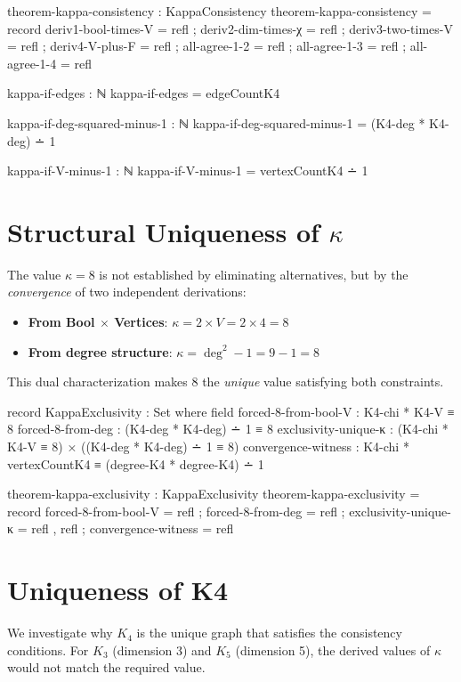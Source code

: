 \documentclass[11pt,a4paper]{book}
\begin{document}
\begin{code}
theorem-kappa-consistency : KappaConsistency
theorem-kappa-consistency = record
  { deriv1-bool-times-V  = refl
  ; deriv2-dim-times-χ   = refl
  ; deriv3-two-times-V   = refl
  ; deriv4-V-plus-F      = refl
  ; all-agree-1-2        = refl
  ; all-agree-1-3        = refl
  ; all-agree-1-4        = refl
  }

kappa-if-edges : ℕ
kappa-if-edges = edgeCountK4

kappa-if-deg-squared-minus-1 : ℕ
kappa-if-deg-squared-minus-1 = (K4-deg * K4-deg) ∸ 1

kappa-if-V-minus-1 : ℕ
kappa-if-V-minus-1 = vertexCountK4 ∸ 1
\end{code}

\section{Structural Uniqueness of \texorpdfstring{$\kappa$}{kappa}}

The value $\kappa = 8$ is not established by eliminating alternatives, but by the \emph{convergence} of two independent derivations:
\begin{itemize}
\item \textbf{From Bool $\times$ Vertices}: $\kappa = 2 \times V = 2 \times 4 = 8$
\item \textbf{From degree structure}: $\kappa = \deg^2 - 1 = 9 - 1 = 8$
\end{itemize}
This dual characterization makes 8 the \emph{unique} value satisfying both constraints.

\begin{code}
record KappaExclusivity : Set where
  field
    forced-8-from-bool-V   : K4-chi * K4-V ≡ 8
    forced-8-from-deg      : (K4-deg * K4-deg) ∸ 1 ≡ 8
    exclusivity-unique-κ   : (K4-chi * K4-V ≡ 8) × ((K4-deg * K4-deg) ∸ 1 ≡ 8)
    convergence-witness    : K4-chi * vertexCountK4 ≡ (degree-K4 * degree-K4) ∸ 1

theorem-kappa-exclusivity : KappaExclusivity
theorem-kappa-exclusivity = record
  { forced-8-from-bool-V = refl
  ; forced-8-from-deg = refl
  ; exclusivity-unique-κ = refl , refl
  ; convergence-witness = refl
  }
\end{code}

\section{Uniqueness of K4}

We investigate why $K_4$ is the unique graph that satisfies the consistency conditions. For $K_3$ (dimension 3) and $K_5$ (dimension 5), the derived values of $\kappa$ would not match the required value.
\end{document}
